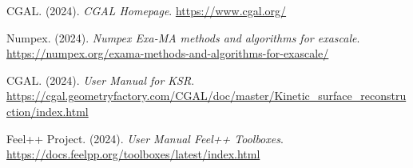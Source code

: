 \documentclass[10pt]{beamer}
\begin{document}
\begin{frame}
  \begin{thebibliography}{widestlabel}
  CGAL. (2024).
  \textit{CGAL Homepage}.
  \url{https://www.cgal.org/}

Numpex. (2024).
\textit{Numpex Exa-MA methods and algorithms for exascale}.
\url{https://numpex.org/exama-methods-and-algorithms-for-exascale/}

CGAL. (2024).
\textit{User Manual for KSR}.
\url{https://cgal.geometryfactory.com/CGAL/doc/master/Kinetic_surface_reconstruction/index.html}

Feel++ Project. (2024).
\textit{User Manual Feel++ Toolboxes}.
\url{https://docs.feelpp.org/toolboxes/latest/index.html}

\end{thebibliography}

\end{frame}
\end{document}
